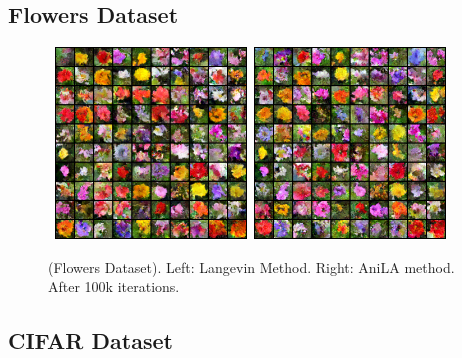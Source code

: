 \documentclass{article}
\begin{document}
\subsection{Flowers Dataset}

\begin{figure}[H]
    \begin{center}
        \mbox{
        \includegraphics[width=2in]{figs/flowerslangevin}
        \includegraphics[width=2in]{figs/flowersanila}
        }
    \end{center}
    \vspace{-0.1in}
	\caption{(Flowers Dataset). Left: Langevin Method. Right: AniLA method. After 100k iterations.}
	\label{fig:flowers}
\end{figure}

\subsection{CIFAR Dataset}
\end{document}
